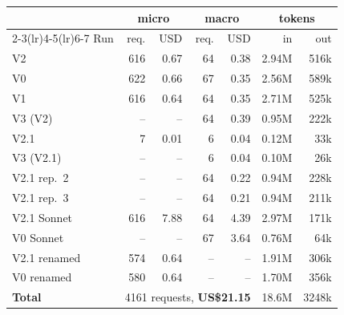 \begin{tabular}{l rr rr rr}
\toprule
& \multicolumn{2}{c}{micro} & \multicolumn{2}{c}{macro} & \multicolumn{2}{c}{tokens}\\
\cmidrule(lr){2-3}\cmidrule(lr){4-5}\cmidrule(lr){6-7}
Run & req. & USD & req. & USD & in & out\\
\midrule
V2 & 616 & 0.67 & 64 & 0.38 & 2.94M & 516k \\
V0 & 622 & 0.66 & 67 & 0.35 & 2.56M & 589k \\
V1 & 616 & 0.64 & 64 & 0.35 & 2.71M & 525k \\
V3 (V2) & -- & -- & 64 & 0.39 & 0.95M & 222k \\
V2.1 & 7 & 0.01 & 6 & 0.04 & 0.12M & 33k \\
V3 (V2.1) & -- & -- & 6 & 0.04 & 0.10M & 26k \\
V2.1 rep.~2 & -- & -- & 64 & 0.22 & 0.94M & 228k \\
V2.1 rep.~3 & -- & -- & 64 & 0.21 & 0.94M & 211k \\
V2.1 Sonnet & 616 & 7.88 & 64 & 4.39 & 2.97M & 171k \\
V0 Sonnet & -- & -- & 67 & 3.64 & 0.76M & 64k \\
V2.1 renamed & 574 & 0.64 & -- & -- & 1.91M & 306k \\
V0 renamed & 580 & 0.64 & -- & -- & 1.70M & 356k \\
\midrule
\textbf{Total} & \multicolumn{4}{c}{4161 requests, \textbf{US\$21.15}} & 18.6M & 3248k \\
\bottomrule
\end{tabular}
